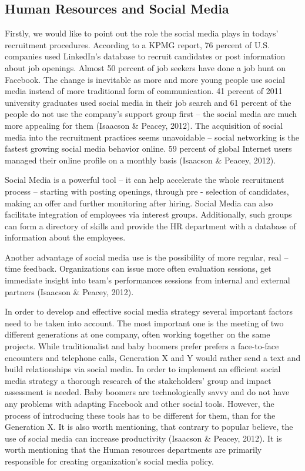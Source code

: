 \documentclass[a4paper,fleqn,11pt,dvips,titlepage]{article}
\numberwithin{figure}{section}
\numberwithin{equation}{section}
\begin{document}
\subsection{Human Resources and Social Media}

Firstly, we would like to point out the role the social media plays in todays’ recruitment procedures.
According to a KPMG report, 76 percent of U.S. companies used LinkedIn’s database to recruit candidates or post information about job openings.
Almost 50 percent of job seekers have done a job hunt on Facebook.
The change is inevitable as more and more young people use social media instead of more traditional form of communication.
41 percent of 2011 university graduates used social media in their job search and 61 percent of the people do not use the company’s support group first –
the social media are much more appealing for them (Isaacson \& Peacey, 2012).
The acquisition of social media into the recruitment practices seems unavoidable –
social networking is the fastest growing social media behavior online.
59 percent of global Internet users managed their online profile on a monthly basis (Isaacson \& Peacey, 2012). 

Social Media is a powerful tool – it can help accelerate the whole recruitment process – starting with posting openings,
through pre - selection of candidates, making an offer and further monitoring after hiring.
Social Media can also facilitate integration of employees via interest groups.
Additionally, such groups can form a directory of skills and provide the HR department with a database of information about the employees. 

Another advantage of social media use is the possibility of more regular, real – time feedback.
Organizations can issue more often evaluation sessions,
get immediate insight into team’s performances sessions from internal and external partners (Isaacson \& Peacey, 2012). 

In order to develop and effective social media strategy several important factors need to be taken into account.
The most important one is the meeting of two different generations at one company, often working together on the same projects.
While traditionalist and baby boomers prefer prefers a face-to-face encounters and telephone calls,
Generation X and Y would rather send a text and build relationships via social media.
In order to implement an efficient social media strategy a thorough research of the stakeholders’ group and impact assessment is needed.
Baby boomers are technologically savvy and do not have any problems with adapting Facebook and other social tools.
However, the process of introducing these tools has to be different for them, than for the Generation X.
It is also worth mentioning, that contrary to popular believe, the use of social media can increase productivity (Isaacson \& Peacey, 2012).
It is worth mentioning that the Human resources departments are primarily responsible for creating organization’s social media policy. 
\end{document}
